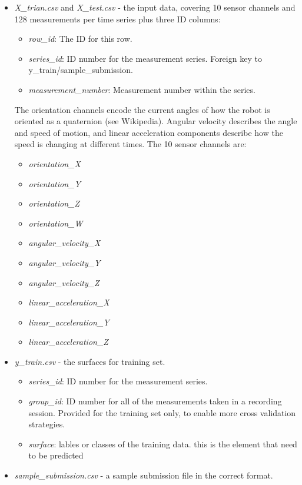 \documentclass[]{article}
\providecommand{\tightlist}{%
  \setlength{\itemsep}{0pt}\setlength{\parskip}{0pt}}
\begin{document}
\begin{itemize}
\item
  \emph{X\_trian.csv} and \emph{X\_test.csv} - the input data, covering
  10 sensor channels and 128 measurements per time series plus three ID
  columns:

  \begin{itemize}
  \tightlist
  \item
    \emph{row\_id}: The ID for this row.
  \item
    \emph{series\_id}: ID number for the measurement series. Foreign key
    to y\_train/sample\_submission.
  \item
    \emph{measurement\_number}: Measurement number within the series.
  \end{itemize}

  The orientation channels encode the current angles of how the robot is
  oriented as a quaternion (see Wikipedia). Angular velocity describes
  the angle and speed of motion, and linear acceleration components
  describe how the speed is changing at different times. The 10 sensor
  channels are:

  \begin{itemize}
  \tightlist
  \item
    \emph{orientation\_X}
  \item
    \emph{orientation\_Y}
  \item
    \emph{orientation\_Z}
  \item
    \emph{orientation\_W}
  \item
    \emph{angular\_velocity\_X}
  \item
    \emph{angular\_velocity\_Y}
  \item
    \emph{angular\_velocity\_Z}
  \item
    \emph{linear\_acceleration\_X}
  \item
    \emph{linear\_acceleration\_Y}
  \item
    \emph{linear\_acceleration\_Z}
  \end{itemize}
\item
  \emph{y\_train.csv} - the surfaces for training set.

  \begin{itemize}
  \tightlist
  \item
    \emph{series\_id}: ID number for the measurement series.
  \item
    \emph{group\_id}: ID number for all of the measurements taken in a
    recording session. Provided for the training set only, to enable
    more cross validation strategies.
  \item
    \emph{surface}: lables or classes of the training data. this is the
    element that need to be predicted
  \end{itemize}
\item
  \emph{sample\_submission.csv} - a sample submission file in the
  correct format.
\end{itemize}
\end{document}
